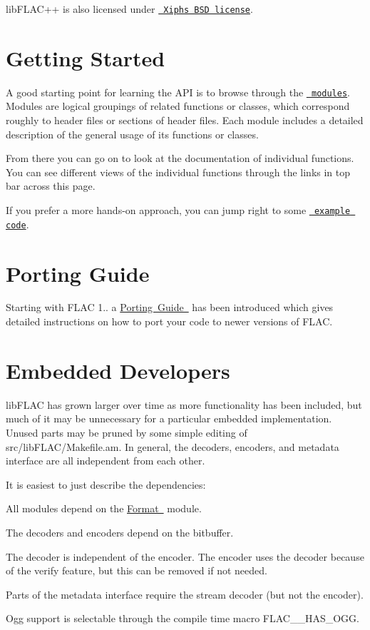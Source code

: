 lib\+F\+L\+A\+C++ is also licensed under \href{../license.html}{\texttt{ Xiph\textquotesingle{}s B\+SD license}}.\hypertarget{index_getting_started}{}\section{Getting Started}\label{index_getting_started}
A good starting point for learning the A\+PI is to browse through the \href{modules.html}{\texttt{ modules}}. Modules are logical groupings of related functions or classes, which correspond roughly to header files or sections of header files. Each module includes a detailed description of the general usage of its functions or classes.

From there you can go on to look at the documentation of individual functions. You can see different views of the individual functions through the links in top bar across this page.

If you prefer a more hands-\/on approach, you can jump right to some \href{../documentation_example_code.html}{\texttt{ example code}}.\hypertarget{index_porting_guide}{}\section{Porting Guide}\label{index_porting_guide}
Starting with F\+L\+AC 1.. a \mbox{\hyperlink{group__porting}{Porting Guide }} has been introduced which gives detailed instructions on how to port your code to newer versions of F\+L\+AC.\hypertarget{index_embedded_developers}{}\section{Embedded Developers}\label{index_embedded_developers}
lib\+F\+L\+AC has grown larger over time as more functionality has been included, but much of it may be unnecessary for a particular embedded implementation. Unused parts may be pruned by some simple editing of src/lib\+F\+L\+A\+C/\+Makefile.\+am. In general, the decoders, encoders, and metadata interface are all independent from each other.

It is easiest to just describe the dependencies\+:


\begin{DoxyItemize}
\item All modules depend on the \mbox{\hyperlink{group__flac__format}{Format }} module.
\item The decoders and encoders depend on the bitbuffer.
\item The decoder is independent of the encoder. The encoder uses the decoder because of the verify feature, but this can be removed if not needed.
\item Parts of the metadata interface require the stream decoder (but not the encoder).
\item Ogg support is selectable through the compile time macro {\ttfamily F\+L\+A\+C\+\_\+\+\_\+\+H\+A\+S\+\_\+\+O\+GG}.
\end{DoxyItemize}

